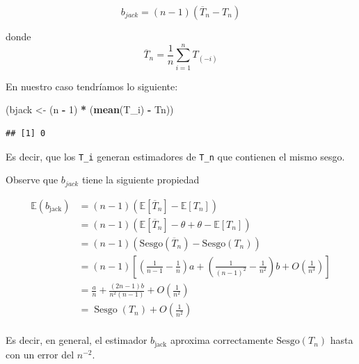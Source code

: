 \documentclass[
  12pt,
]{book}
\newenvironment{Shaded}{\begin{snugshade}}{\end{snugshade}}
\newcommand{\DecValTok}[1]{\textcolor[rgb]{0.00,0.00,0.81}{#1}}
\newcommand{\KeywordTok}[1]{\textcolor[rgb]{0.13,0.29,0.53}{\textbf{#1}}}
\newcommand{\NormalTok}[1]{#1}
\newcommand{\OperatorTok}[1]{\textcolor[rgb]{0.81,0.36,0.00}{\textbf{#1}}}
\newcommand{\StringTok}[1]{\textcolor[rgb]{0.31,0.60,0.02}{#1}}
\theoremstyle{definition}
\theoremstyle{definition}
\theoremstyle{definition}
\theoremstyle{remark}
\let\BeginKnitrBlock\begin \let\EndKnitrBlock\end
\begin{document}
\begin{equation*}
b_{jack} = (n-1) (\overline{T}_{n} - T_{n})
\end{equation*}

donde
\begin{equation*}
\overline{T}_{n} = \frac{1}{n} \sum_{i=1}^{n} T_{(-i)}
\end{equation*}

\BeginKnitrBlock{exercise}
\protect\hypertarget{exr:unnamed-chunk-71}{}{\label{exr:unnamed-chunk-71} }En nuestro caso tendríamos lo siguiente:
\EndKnitrBlock{exercise}

\begin{Shaded}
\begin{Highlighting}[]
\NormalTok{(bjack <-}\StringTok{ }\NormalTok{(n }\OperatorTok{-}\StringTok{ }\DecValTok{1}\NormalTok{) }\OperatorTok{*}\StringTok{ }\NormalTok{(}\KeywordTok{mean}\NormalTok{(T_i) }\OperatorTok{-}\StringTok{ }\NormalTok{Tn))}
\end{Highlighting}
\end{Shaded}

\begin{verbatim}
## [1] 0
\end{verbatim}

Es decir, que los \texttt{T\_i} generan estimadores de \texttt{T\_n}
que contienen el mismo sesgo.

Observe que \(b_{jack}\) tiene la siguiente propiedad

\begin{align*}
\mathbb{E}\left(b_{\text {jack}}\right)
&= (n-1)\left(\mathbb{E}\left[\overline{T}_{n}\right] -
\mathbb{E}\left[T_{n}\right]\right) \\
&= (n-1)\left(\mathbb{E}\left[\overline{T}_{n}\right] - \theta +
\theta - \mathbb{E}\left[T_{n}\right]\right) \\
& =(n-1)\left(\mathrm{Sesgo} \left(\overline{T}_{n}\right)
-\mathrm{Sesgo}\left(T_{n}\right)\right) \\
& =(n-1)\left[\left(\frac{1}{n-1}
-\frac{1}{n}\right)
a+\left(\frac{1}{(n-1)^{2}}
-\frac{1}{n^{2}}\right) b+O\left(\frac{1}{n^{3}}\right)\right] \\
& =\frac{a}{n}
+\frac{(2 n-1) b}{n^{2}(n-1)}
+O\left(\frac{1}{n^{2}}\right) \\
& =\operatorname{Sesgo}\left(T_{n}\right)
+O\left(\frac{1}{n^{2}}\right)\\
\end{align*}

\BeginKnitrBlock{remark}
{}Es decir, en general, el estimador \(b_{\text{jack}}\) aproxima
correctamente \(\mathrm{Sesgo}\left( T_{n} \right)\) hasta con un
error del \(n^{-2}\).
\EndKnitrBlock{remark}
\end{document}
